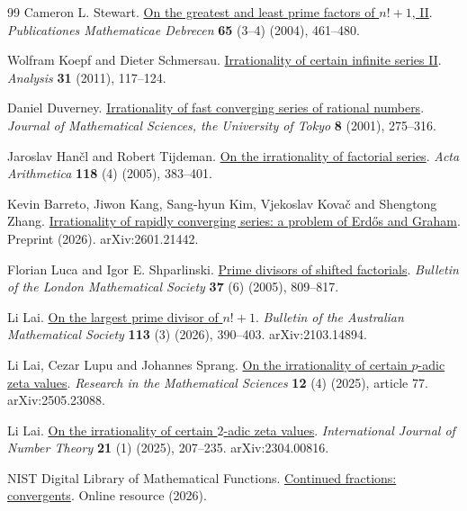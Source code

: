 \documentclass[11pt]{article}
\begin{document}
\begin{thebibliography}{99}
Cameron L. Stewart. \href{https://doi.org/10.5486/PMD.2004.3190}{On the greatest and least prime factors of {$n!+1$}, {II}}.
\emph{Publicationes Mathematicae Debrecen} \textbf{65} (3--4) (2004), 461--480.

Wolfram Koepf and Dieter Schmersau. \href{https://doi.org/10.1524/anly.2011.1094}{Irrationality of certain infinite series {II}}.
\emph{Analysis} \textbf{31} (2011), 117--124.

Daniel Duverney. \href{https://www.ms.u-tokyo.ac.jp/journal/pdf/jms080206.pdf}{Irrationality of fast converging series of rational numbers}.
\emph{Journal of Mathematical Sciences, the University of Tokyo} \textbf{8} (2001), 275--316.

Jaroslav Han{\v c}l and Robert Tijdeman. \href{https://doi.org/10.4064/aa118-4-5}{On the irrationality of factorial series}.
\emph{Acta Arithmetica} \textbf{118} (4) (2005), 383--401.

Kevin Barreto, Jiwon Kang, Sang-hyun Kim, Vjekoslav Kova{\v c} and Shengtong Zhang. \href{https://arxiv.org/abs/2601.21442v3}{Irrationality of rapidly converging series: a problem of {Erd{\H o}s} and {Graham}}.
Preprint (2026). arXiv:2601.21442.

Florian Luca and Igor E. Shparlinski. \href{https://doi.org/10.1112/S0024609305004923}{Prime divisors of shifted factorials}.
\emph{Bulletin of the London Mathematical Society} \textbf{37} (6) (2005), 809--817.

Li Lai. \href{https://doi.org/10.1017/S0004972725100543}{On the largest prime divisor of {$n!+1$}}.
\emph{Bulletin of the Australian Mathematical Society} \textbf{113} (3) (2026), 390--403. arXiv:2103.14894.

Li Lai, Cezar Lupu and Johannes Sprang. \href{https://doi.org/10.1007/s40687-025-00559-x}{On the irrationality of certain {$p$}-adic zeta values}.
\emph{Research in the Mathematical Sciences} \textbf{12} (4) (2025), article 77. arXiv:2505.23088.

Li Lai. \href{https://doi.org/10.1142/S1793042125500113}{On the irrationality of certain {$2$}-adic zeta values}.
\emph{International Journal of Number Theory} \textbf{21} (1) (2025), 207--235. arXiv:2304.00816.

{NIST Digital Library of Mathematical Functions}. \href{https://dlmf.nist.gov/1.12}{Continued fractions: convergents}.
Online resource (2026).


\end{thebibliography}
\end{document}
